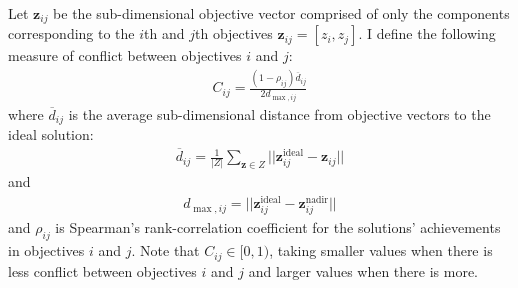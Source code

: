 Let $\mathbf{z}_{ij}$ be the sub-dimensional objective vector comprised of only the components corresponding to the $i$th and $j$th objectives $\mathbf{z}_{ij} = [z_i,z_j]$. I define the following measure of conflict between objectives $i$ and $j$:
\begin{align}
C_{ij} = \frac{(1-\rho_{ij})\overbar{d}_{ij}}{2 d_{\max,ij}} \label{eqn:defConflict}
\end{align}
where $\overbar{d}_{ij}$ is the average sub-dimensional distance from objective vectors to the ideal solution:
\begin{align}
\overbar{d}_{ij} = \frac{1}{|Z|} \sum_{\mathbf{z} \in Z} ||\mathbf{z}^{\text{ideal}}_{ij} - \mathbf{z}_{ij}||
\end{align}
and
\begin{align}
d_{\max,ij} = ||\mathbf{z}^{\text{ideal}}_{ij} - \mathbf{z}^{\text{nadir}}_{ij}||
\end{align}
and $\rho_{ij}$ is Spearman's rank-correlation coefficient for the solutions' achievements in objectives $i$ and $j$. Note that $C_{ij} \in [0,1)$, taking smaller values when there is less conflict between objectives $i$ and $j$ and larger values when there is more.

